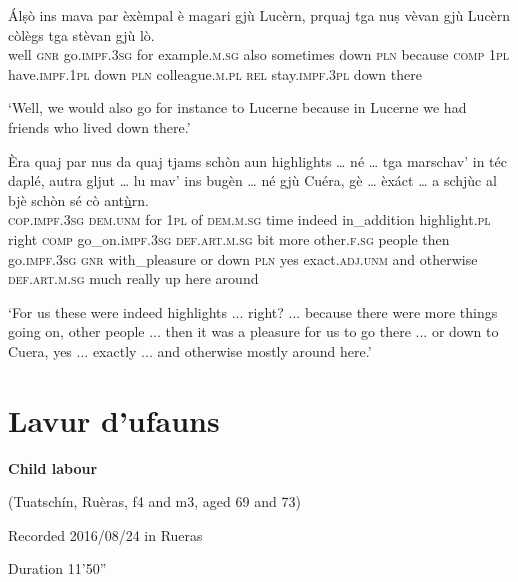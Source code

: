 \begin{linenumbers}
	\gll  Álṣò ins mava par èxèmpal è magari gjù Lucèrn, prquaj tga nuṣ vèvan gjù Lucèrn còlègs tga stèvan gjù lò.\\
	well \textsc{gnr} go.\textsc{impf.3sg} for example\textsc{.m.sg} also sometimes down \textsc{pln} because \textsc{comp} \textsc{1pl} have.\textsc{impf.1pl} down \textsc{pln} colleague.\textsc{m.pl} \textsc{rel} stay.\textsc{impf.3pl} down there\\
\end{linenumbers}
\medskip
\glt `Well, we would also go for instance to Lucerne because in Lucerne we had friends who lived down there.'
\medskip

\begin{linenumbers}
	\gll  Èra quaj par nus da quaj tjams schòn aun highlights … né … tga marschav’ in téc daplé, autra gljut … lu mav’ ins bugèn … né gjù Cuéra, gè … èxáct … a schjùc al bjè schòn sé cò ant\underline{ù}rn.\\
\textsc{cop.impf.3sg} \textsc{dem.unm} for \textsc{1pl} of \textsc{dem.m.sg} time indeed in\_addition highlight.\textsc{pl} {} right {} \textsc{comp} go\_on.i\textsc{mpf.3sg} \textsc{def.art.m.sg} bit more other.\textsc{f.sg} people {} then go.\textsc{impf.3sg} \textsc{gnr} with\_pleasure {} or down \textsc{pln} yes {} exact.\textsc{adj.unm} {} and otherwise \textsc{def.art.m.sg} much really up here around	\\
\end{linenumbers}
\medskip
\glt `For us these were indeed highlights ... right? ... because there were more things going on, other people ... then it was a pleasure for us to go there ... or down to Cuera, yes ... exactly ... and otherwise mostly around here.'
\medskip

\section{Lavur d'ufauns}

\noindent
\textbf{Child labour}

\noindent
(Tuatschín, Ruèras, f4 and m3, aged 69 and 73)

\noindent
Recorded 2016/08/24 in Rueras

\noindent
Duration 11'50''

\bigskip

